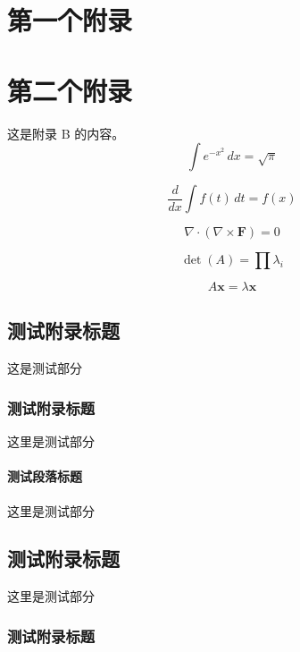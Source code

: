 \appendix       %

\section{第一个附录}

\section{第二个附录}
这是附录 B 的内容。
\begin{equation} \label{eq1}
\int e^{-x^2} \, dx = \sqrt{\pi}
\end{equation}

\begin{equation} \label{eq2}
\frac{d}{dx} \int f(t) \, dt = f(x)
\end{equation}

\begin{equation} \label{eq3}
\nabla \cdot (\nabla \times \mathbf{F}) = 0
\end{equation}

\begin{equation} \label{eq4}
\det(A) = \prod \lambda_i
\end{equation}

\begin{equation} \label{eq5}
A \mathbf{x} = \lambda \mathbf{x}
\end{equation}

\subsection{测试附录标题}

这是测试部分
\subsubsection{测试附录标题}
这里是测试部分
\paragraph{测试段落标题}
  这里是测试部分

\subsection{测试附录标题}
这里是测试部分    
\subsubsection{测试附录标题}